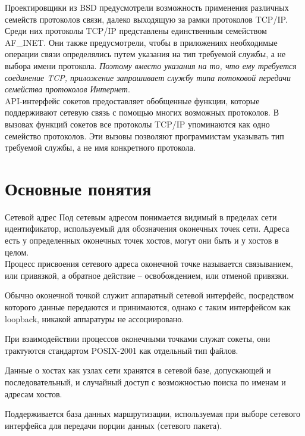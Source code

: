 \begin{frame}{}
Проектировщики из BSD предусмотрели возможность применения различных семейств протоколов связи,  далеко выходящую за рамки протоколов TCP/IP. \\
Среди них протоколы TCP/IP представлены единственным семейством AF\_INET. Они также предусмотрели,  
чтобы в приложениях необходимые операции связи определялись путем указания на тип требуемой службы,
а не выбора имени протокола. {\itshape Поэтому вместо указания на то,  что ему требуется соединение TCP,
приложение запрашивает службу типа потоковой передачи семейства протоколов Интернет}.\\

API-интерфейс сокетов предоставляет обобщенные функции,  которые поддерживают сетевую связь с помощью многих возможных протоколов. В вызовах функций сокетов все протоколы TCP/IP упоминаются как одно семейство протоколов. Эти вызовы позволяют программистам указывать тип требуемой службы,  а не имя конкретного протокола.
\end{frame}

\section{Основные понятия}

\begin{frame}{Сетевой адрес}
Под сетевым адресом понимается видимый в пределах сети идентификатор, используемый для обозначения оконечных точек сети. Адреса есть у определенных оконечных точек хостов, могут они быть и у хостов в целом. \\
\pause
Процесс присвоения сетевого адреса оконечной точке называется связыванием, или привязкой, а обратное действие -- освобождением, или отменой привязки. 

Обычно оконечной точкой служит аппаратный сетевой интерфейс, посредством которого данные передаются и принимаются, однако с таким интерфейсом как loopback, никакой аппаратуры не ассоциировано. 

\pause
При взаимодействии процессов оконечными точками служат сокеты, они трактуются стандартом POSIX-2001 как отдельный тип файлов.
\end{frame}

\begin{frame}{}
Данные о хостах как узлах сети хранятся в сетевой базе, допускающей и последовательный, и случайный доступ с возможностью поиска по именам и адресам хостов. 

Поддерживается база данных маршрутизации, используемая при выборе сетевого интерфейса для передачи порции данных (сетевого пакета). 
\end{frame}

